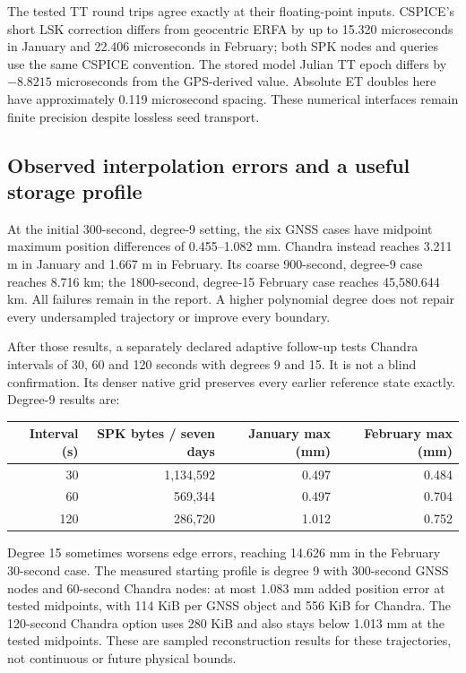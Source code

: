 The tested TT round trips agree exactly at their floating-point inputs.
CSPICE's short LSK correction differs from geocentric ERFA by up to
15.320 microseconds in January and 22.406 microseconds in February; both SPK
nodes and queries use the same CSPICE convention. The stored model Julian TT
epoch differs by $-8.8215$ microseconds from the GPS-derived value. Absolute
ET doubles here have approximately 0.119 microsecond spacing. These numerical
interfaces remain finite precision despite lossless seed transport.

\subsection{Observed interpolation errors and a useful storage profile}
At the initial 300-second, degree-9 setting, the six GNSS cases have midpoint
maximum position differences of 0.455--1.082 mm. Chandra instead reaches
3.211 m in January and 1.667 m in February. Its coarse 900-second, degree-9
case reaches 8.716 km; the 1800-second, degree-15 February case reaches
45,580.644 km. All failures remain in the report. A higher polynomial degree
does not repair every undersampled trajectory or improve every boundary.

After those results, a separately declared adaptive follow-up tests Chandra
intervals of 30, 60 and 120 seconds with degrees 9 and 15. It is not a blind
confirmation. Its denser native grid preserves every earlier reference state
exactly. Degree-9 results are:
\begin{center}
\begin{tabular}{rrrr}
\toprule
Interval (s) & SPK bytes / seven days & January max (mm) & February max (mm)\\
\midrule
30 & 1,134,592 & 0.497 & 0.484\\
60 & 569,344 & 0.497 & 0.704\\
120 & 286,720 & 1.012 & 0.752\\
\bottomrule
\end{tabular}
\end{center}
Degree 15 sometimes worsens edge errors, reaching 14.626 mm in the February
30-second case. The measured starting profile is degree 9 with 300-second
GNSS nodes and 60-second Chandra nodes: at most 1.083 mm added position error
at tested midpoints, with 114 KiB per GNSS object and 556 KiB for Chandra.
The 120-second Chandra option uses 280 KiB and also stays below 1.013 mm at
the tested midpoints. These are sampled reconstruction results for these
trajectories, not continuous or future physical bounds.

